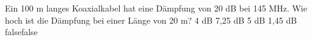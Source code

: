     {Ein 100 m langes Koaxialkabel hat eine Dämpfung von 20 dB bei 145 MHz. Wie hoch ist die Dämpfung bei einer Länge von 20 m?}
    {4 dB}
    {7,25 dB}
    {5 dB}
    {1,45 dB}
    {false}{false}